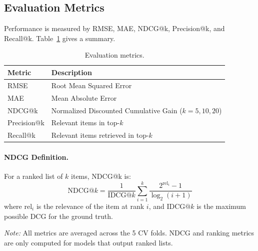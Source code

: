 \subsection{Evaluation Metrics}

Performance is measured by RMSE, MAE, NDCG@k, Precision@k, and Recall@k. Table~\ref{tab:metrics} gives a summary.

\begin{table}[h]
\centering
\caption{Evaluation metrics.}
\label{tab:metrics}
\begin{tabular}{ll}
\toprule
Metric & Description \\
\midrule
RMSE & Root Mean Squared Error \\
MAE & Mean Absolute Error \\
NDCG@k & Normalized Discounted Cumulative Gain ($k=5,10,20$) \\
Precision@k & Relevant items in top-$k$ \\
Recall@k & Relevant items retrieved in top-$k$ \\
\bottomrule
\end{tabular}
\end{table}

\paragraph{NDCG Definition.}
For a ranked list of $k$ items, NDCG@k is:
\[
\mathrm{NDCG}@k = \frac{1}{\mathrm{IDCG}@k} \sum_{i=1}^k \frac{2^{\mathrm{rel}_i} - 1}{\log_2(i+1)}
\]
where $\mathrm{rel}_i$ is the relevance of the item at rank $i$, and $\mathrm{IDCG}@k$ is the maximum possible DCG for the ground truth.

\textit{Note:} All metrics are averaged across the 5 CV folds. NDCG and ranking metrics are only computed for models that output ranked lists.





